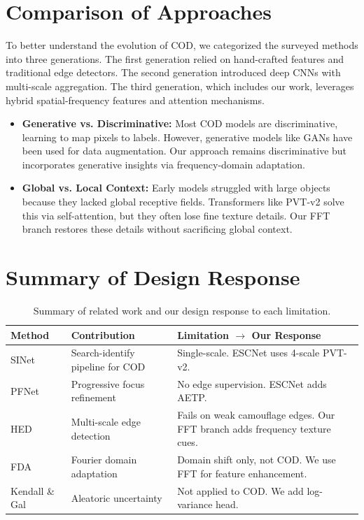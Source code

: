 \documentclass[12pt,a4paper]{report}
\begin{document}
\section{Comparison of Approaches}

To better understand the evolution of COD, we categorized the surveyed methods into three generations. The first generation relied on hand-crafted features and traditional edge detectors. The second generation introduced deep CNNs with multi-scale aggregation. The third generation, which includes our work, leverages hybrid spatial-frequency features and attention mechanisms.

\begin{itemize}
    \item \textbf{Generative vs. Discriminative:} Most COD models are discriminative, learning to map pixels to labels. However, generative models like GANs have been used for data augmentation. Our approach remains discriminative but incorporates generative insights via frequency-domain adaptation.
    \item \textbf{Global vs. Local Context:} Early models struggled with large objects because they lacked global receptive fields. Transformers like PVT-v2 solve this via self-attention, but they often lose fine texture details. Our FFT branch restores these details without sacrificing global context.
\end{itemize}

\section{Summary of Design Response}

\begin{table}[H]
\centering
\caption{Summary of related work and our design response to each limitation.}
\label{tab:litreview}
\begin{tabular}{@{}p{2.4cm}p{3.4cm}p{5.5cm}@{}}
\toprule
\textbf{Method} & \textbf{Contribution} & \textbf{Limitation $\to$ Our Response} \\
\midrule
SINet~\cite{fan2020sinet}  & Search-identify pipeline for COD & Single-scale. ESCNet uses 4-scale PVT-v2. \\[4pt]
PFNet~\cite{mei2021pfnet}  & Progressive focus refinement & No edge supervision. ESCNet adds AETP. \\[4pt]
HED~\cite{xie2015hed}      & Multi-scale edge detection & Fails on weak camouflage edges. Our FFT branch adds frequency texture cues. \\[4pt]
FDA~\cite{yang2020fda}     & Fourier domain adaptation & Domain shift only, not COD. We use FFT for feature enhancement. \\[4pt]
Kendall \& Gal~\cite{kendall2017uncertainties} & Aleatoric uncertainty & Not applied to COD. We add log-variance head. \\
\bottomrule
\end{tabular}
\end{table}
\end{document}
